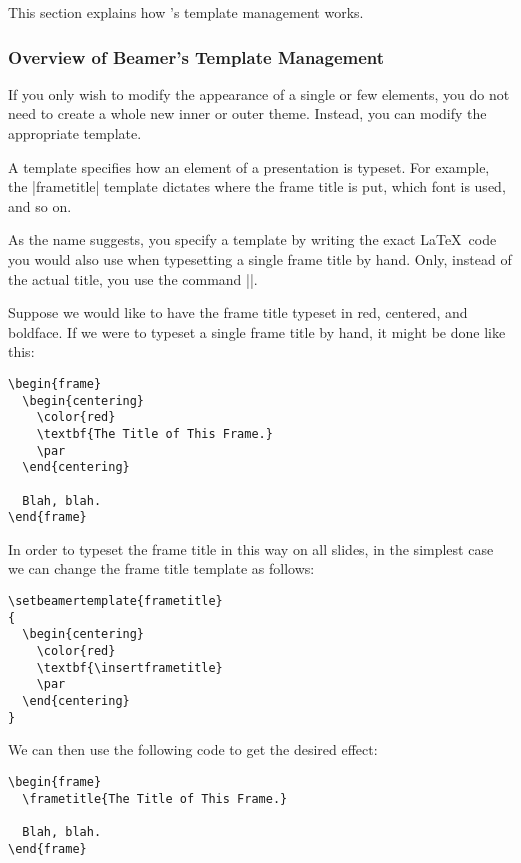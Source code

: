 This section explains how \beamer's template management works.

\subsubsection{Overview of Beamer's Template Management}

If you only wish to modify the appearance of a single or few elements, you do not need to create a whole new inner or outer theme. Instead, you can modify the appropriate template.

A template specifies how an element of a presentation is typeset. For example, the |frametitle| template dictates where the frame title is put, which font is used, and so on.

As the name suggests, you specify a template by writing the exact \LaTeX\ code you would also use when typesetting a single frame title by hand. Only, instead of the actual title, you use the command |\insertframetitle|.

\example
Suppose we would like to have the frame title typeset in red, centered, and boldface. If we were to typeset a single frame title by hand, it might be done like this:

\begin{verbatim}
\begin{frame}
  \begin{centering}
    \color{red}
    \textbf{The Title of This Frame.}
    \par
  \end{centering}

  Blah, blah.
\end{frame}
\end{verbatim}

In order to typeset the frame title in this way on all slides, in the simplest case we can change the frame title template as follows:

\begin{verbatim}
\setbeamertemplate{frametitle}
{
  \begin{centering}
    \color{red}
    \textbf{\insertframetitle}
    \par
  \end{centering}
}
\end{verbatim}
We can then use the following code to get the desired effect:
\begin{verbatim}
\begin{frame}
  \frametitle{The Title of This Frame.}

  Blah, blah.
\end{frame}
\end{verbatim}

